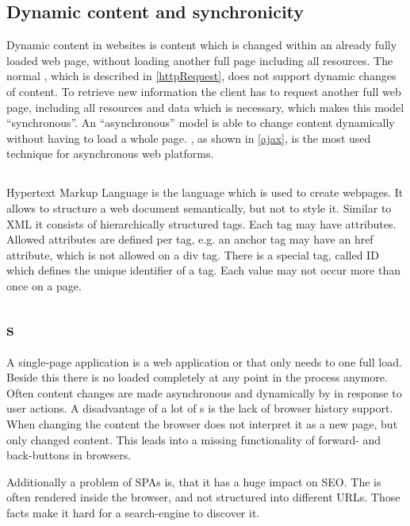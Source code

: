 \subsection{Dynamic content and synchronicity\label{synchronicity}}
Dynamic content in websites is content which is changed within an already fully loaded web page, without loading another full page including all resources. The normal \httpRequest{}, which is described in \ref{httpRequest}, does not support dynamic changes of content. To retrieve new information the client has to request another full web page, including all resources and data which is necessary, which makes this model \enquote{synchronous}.
An \enquote{asynchronous} model is able to change content dynamically without having to load a whole page. \ajax{}, as shown in \ref{ajax}, is the most used technique for asynchronous web platforms.

\subsection{\html{}\label{html}}
Hypertext Markup Language is the language which is used to create webpages.
It allows to structure a web document semantically, but not to style it.
Similar to XML it consists of hierarchically structured tags.
Each tag may have attributes.
Allowed attributes are defined per tag, e.g. an anchor tag may have an href attribute, which is not allowed on a div tag.
There is a special tag, called ID which defines the unique identifier of a tag.
Each value may not occur more than once on a page.

\subsection{\SinglePageApplication{}s\label{singlePageApplication}}
A single-page application is a web application or \webSite{} that only needs to one full \webPage{} load.
Beside this there is no \webPage{} loaded completely at any point in the process anymore.
Often content changes are made asynchronous and dynamically by \ajax{} in response to user actions.
A disadvantage of a lot of \singlePageApplication{}s is the lack of browser history support.
When changing the content the browser does not interpret it as a new page, but only changed content.
This leads into a missing functionality of forward- and back-buttons in browsers.

Additionally a problem of SPAs is, that it has a huge impact on SEO.
The \webPage{} is often rendered inside the browser, and not structured into different URLs.
Those facts make it hard for a search-engine to discover it.

